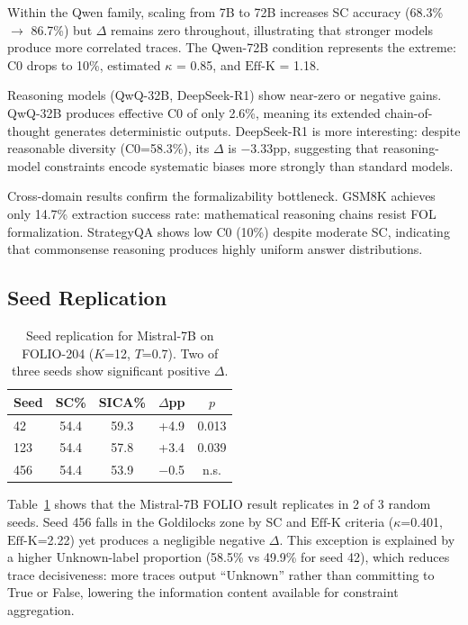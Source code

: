 \documentclass[11pt,a4paper]{article}
\newcommand{\effk}{\text{Eff-K}}
\begin{document}
Within the Qwen family, scaling from 7B to 72B increases SC accuracy (68.3\% $\to$ 86.7\%) but $\Delta$ remains zero throughout, illustrating that stronger models produce more correlated traces. The Qwen-72B condition represents the extreme: C0 drops to 10\%, estimated $\kappa$ = 0.85, and $\effk$ = 1.18.

Reasoning models (QwQ-32B, DeepSeek-R1) show near-zero or negative gains. QwQ-32B produces effective C0 of only 2.6\%, meaning its extended chain-of-thought generates deterministic outputs. DeepSeek-R1 is more interesting: despite reasonable diversity (C0=58.3\%), its $\Delta$ is $-$3.33pp, suggesting that reasoning-model constraints encode systematic biases more strongly than standard models.

Cross-domain results confirm the formalizability bottleneck. GSM8K achieves only 14.7\% extraction success rate: mathematical reasoning chains resist FOL formalization. StrategyQA shows low C0 (10\%) despite moderate SC, indicating that commonsense reasoning produces highly uniform answer distributions.

\subsection{Seed Replication}

\begin{table}[t]
\centering
\small
\caption{Seed replication for Mistral-7B on FOLIO-204 ($K$=12, $T$=0.7). Two of three seeds show significant positive $\Delta$.}
\label{tab:seeds}
\begin{tabular}{lcccc}
\toprule
\textbf{Seed} & \textbf{SC\%} & \textbf{SICA\%} & \textbf{$\Delta$pp} & \textbf{$p$} \\
\midrule
42 & 54.4 & 59.3 & +4.9 & 0.013 \\
123 & 54.4 & 57.8 & +3.4 & 0.039 \\
456 & 54.4 & 53.9 & $-$0.5 & n.s. \\
\bottomrule
\end{tabular}
\end{table}

Table~\ref{tab:seeds} shows that the Mistral-7B FOLIO result replicates in 2 of 3 random seeds. Seed 456 falls in the Goldilocks zone by SC and $\effk$ criteria ($\kappa$=0.401, $\effk$=2.22) yet produces a negligible negative $\Delta$. This exception is explained by a higher Unknown-label proportion (58.5\% vs 49.9\% for seed 42), which reduces trace decisiveness: more traces output ``Unknown'' rather than committing to True or False, lowering the information content available for constraint aggregation.
\end{document}

